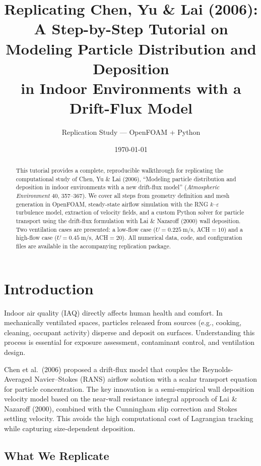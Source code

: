 \documentclass[12pt]{article}
\title{\textbf{Replicating Chen, Yu \& Lai (2006):\\
A Step-by-Step Tutorial on Modeling Particle Distribution and Deposition\\
in Indoor Environments with a Drift-Flux Model}}
\author{Replication Study --- OpenFOAM + Python}
\date{\today}
\begin{document}
\maketitle

\begin{abstract}
This tutorial provides a complete, reproducible walkthrough for replicating the computational study of Chen, Yu \& Lai (2006), ``Modeling particle distribution and deposition in indoor environments with a new drift-flux model'' (\textit{Atmospheric Environment} 40, 357--367). We cover all steps from geometry definition and mesh generation in OpenFOAM, steady-state airflow simulation with the RNG $k$--$\varepsilon$ turbulence model, extraction of velocity fields, and a custom Python solver for particle transport using the drift-flux formulation with Lai \& Nazaroff (2000) wall deposition. Two ventilation cases are presented: a low-flow case ($U=\SI{0.225}{\meter\per\second}$, ACH$=10$) and a high-flow case ($U=\SI{0.45}{\meter\per\second}$, ACH$=20$). All numerical data, code, and configuration files are available in the accompanying replication package.
\end{abstract}

\tableofcontents
\newpage

\section{Introduction}

Indoor air quality (IAQ) directly affects human health and comfort. In mechanically ventilated spaces, particles released from sources (e.g., cooking, cleaning, occupant activity) disperse and deposit on surfaces. Understanding this process is essential for exposure assessment, contaminant control, and ventilation design.

Chen et al.~(2006) proposed a drift-flux model that couples the Reynolds-Averaged Navier--Stokes (RANS) airflow solution with a scalar transport equation for particle concentration. The key innovation is a semi-empirical wall deposition velocity model based on the near-wall resistance integral approach of Lai \& Nazaroff (2000), combined with the Cunningham slip correction and Stokes settling velocity. This avoids the high computational cost of Lagrangian tracking while capturing size-dependent deposition.

\subsection{What We Replicate}
\end{document}
